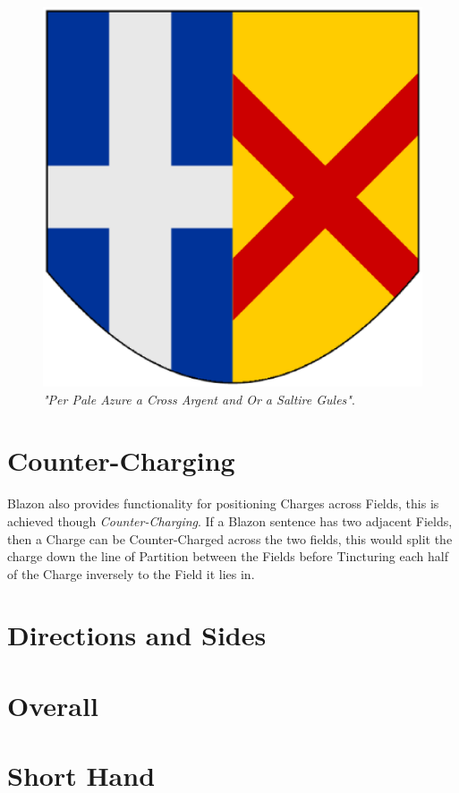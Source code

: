 
\begin{figure}[H]
  \centering
    \includegraphics[width=\textwidth]{blazon/images/perpaleazureacrossargent.eps}
  \caption{\emph{"Per Pale Azure a Cross Argent and Or a Saltire Gules"}.}
  
\end{figure}

\section{Counter-Charging}

Blazon also provides functionality for positioning Charges across Fields, this is achieved though \emph{Counter-Charging}.  If a Blazon sentence has two adjacent Fields, then a Charge can be Counter-Charged across the two fields, this would split the charge down the line of Partition between the Fields before Tincturing each half of the Charge inversely to the Field it lies in.  


\section{Directions and Sides}


\section{Overall}


\section{Short Hand}





